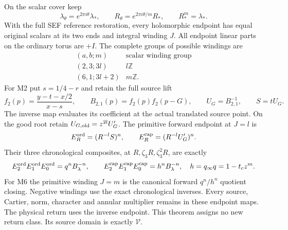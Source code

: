 \begin{theorem}
On the scalar cover keep
\[
 \lambda_\theta=e^{2\pi i\theta}\lambda_*,\qquad
 R_\theta=e^{2\pi i\theta/m}R_*,\qquad R_*^m=\lambda_*.
\]
With the full SEF reference restoration, every holomorphic endpoint
has equal original scalars at its two ends and integral winding
\(J\). All endpoint linear parts on the ordinary torus are \(+I\).
The complete groups of possible windings are
\[
 \begin{array}{c|c}
 (a,b;m)&\text{scalar winding group}\\\hline
 (2,3;3l)&l\mathbb Z\\
 (6,1;3l+2)&m\mathbb Z.
 \end{array}
\]
For M2 put \(s=1/4-r\) and retain the full source lift
\[
 f_2(p)=\frac{y-t-x/2}{x-s},\qquad
 B_{2,1}(p)=f_2(p)f_2(p-G),\qquad U_G=B_{2,1}^{-1},\qquad S=tU_G.
\]
The inverse map evaluates its coefficient at the actual translated
source point. On the good root retain
\(U_{G,\rm old}=z^{2l}U'_G\). The primitive forward endpoint
at \(J=l\) is
\[
 E_R^{\rm ord}=(R^{-l}S)^n,\qquad
 E_R^{\rm cap}=(R^{-l}U'_G)^n.
\]
Their three chronological composites, at
\(R,\zeta_3R,\zeta_3^2R\), are exactly
\[
 E_2^{\rm ord}E_1^{\rm ord}E_0^{\rm ord}=q^nB_\lambda^{-n},
 \qquad
 E_2^{\rm cap}E_1^{\rm cap}E_0^{\rm cap}=h^nB_\lambda^{-n},
 \quad h=q_\infty q=1-t_cz^m.
\]
For M6 the primitive winding \(J=m\) is the canonical forward
\(q^n/h^n\) quotient closing. Negative windings use the exact
chronological inverses. Every source, Cartier, norm, character and
annular multiplier remains in these endpoint maps. The physical
return uses the inverse endpoint. This theorem assigns no new return
class. Its source domain is exactly \(\mathcal V\).
\end{theorem}

